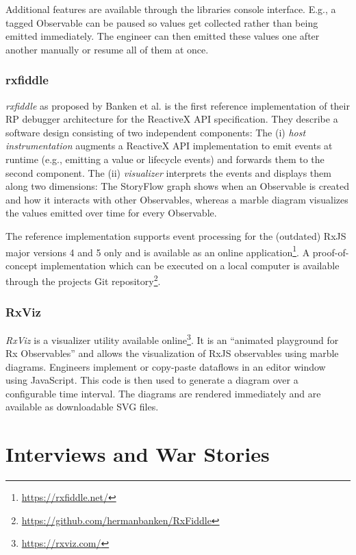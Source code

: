 \documentclass[sigplan,screen,review]{acmart}
\begin{document}
Additional features are available through the libraries console interface. E.g., a tagged Observable can be paused so values get collected rather than being emitted immediately. The engineer can then emitted these values one after another manually or resume all of them at once.

\subsubsection{rxfiddle}

\emph{rxfiddle} as proposed by Banken et al.\cite{10.1145/3180155.3180156} is the first reference implementation of their RP debugger architecture for the ReactiveX API specification. They describe a software design consisting of two independent components: The (i) \emph{host instrumentation} augments a ReactiveX API implementation to emit events at runtime (e.g., emitting a value or lifecycle events) and forwards them to the second component. The (ii) \emph{visualizer} interprets the events and displays them along two dimensions: The StoryFlow graph\cite{YWu2013a} shows when an Observable is created and how it interacts with other Observables, whereas a marble diagram visualizes the values emitted over time for every Observable.

The reference implementation supports event processing for the (outdated) RxJS major versions 4 and 5 only and is available as an online application\footnote{\url{https://rxfiddle.net/}}. A proof-of-concept implementation which can be executed on a local computer is available through the projects Git repository\footnote{\url{https://github.com/hermanbanken/RxFiddle}}.

\subsubsection{RxViz}

\emph{RxViz} is a visualizer utility available online\footnote{\url{https://rxviz.com/}}. It is an ``animated playground for Rx Observables''\cite{rxviz} and allows the visualization of RxJS observables using marble diagrams. Engineers implement or copy-paste dataflows in an editor window using JavaScript. This code is then used to generate a diagram over a configurable time interval. The diagrams are rendered immediately and are available as downloadable SVG files.


\section{Interviews and War Stories}
\label{sec:interviews}
\end{document}
